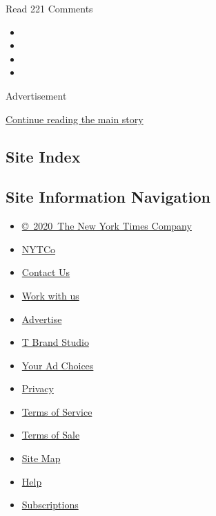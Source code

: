 Read 221 Comments

\begin{itemize}
\item
\item
\item
\item
\end{itemize}

Advertisement

\protect\hyperlink{after-bottom}{Continue reading the main story}

\hypertarget{site-index}{%
\subsection{Site Index}\label{site-index}}

\hypertarget{site-information-navigation}{%
\subsection{Site Information
Navigation}\label{site-information-navigation}}

\begin{itemize}
\tightlist
\item
  \href{https://help.nytimes3xbfgragh.onion/hc/en-us/articles/115014792127-Copyright-notice}{©~2020~The
  New York Times Company}
\end{itemize}

\begin{itemize}
\tightlist
\item
  \href{https://www.nytco.com/}{NYTCo}
\item
  \href{https://help.nytimes3xbfgragh.onion/hc/en-us/articles/115015385887-Contact-Us}{Contact
  Us}
\item
  \href{https://www.nytco.com/careers/}{Work with us}
\item
  \href{https://nytmediakit.com/}{Advertise}
\item
  \href{http://www.tbrandstudio.com/}{T Brand Studio}
\item
  \href{https://www.nytimes3xbfgragh.onion/privacy/cookie-policy\#how-do-i-manage-trackers}{Your
  Ad Choices}
\item
  \href{https://www.nytimes3xbfgragh.onion/privacy}{Privacy}
\item
  \href{https://help.nytimes3xbfgragh.onion/hc/en-us/articles/115014893428-Terms-of-service}{Terms
  of Service}
\item
  \href{https://help.nytimes3xbfgragh.onion/hc/en-us/articles/115014893968-Terms-of-sale}{Terms
  of Sale}
\item
  \href{https://spiderbites.nytimes3xbfgragh.onion}{Site Map}
\item
  \href{https://help.nytimes3xbfgragh.onion/hc/en-us}{Help}
\item
  \href{https://www.nytimes3xbfgragh.onion/subscription?campaignId=37WXW}{Subscriptions}
\end{itemize}
